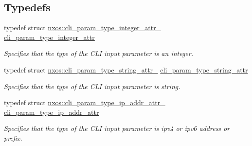 \subsection*{Typedefs}
\begin{DoxyCompactItemize}
\item 
typedef struct \mbox{\hyperlink{structnxos_1_1cli__param__type__integer__attr__}{nxos\+::cli\+\_\+param\+\_\+type\+\_\+integer\+\_\+attr\+\_\+}} \mbox{\hyperlink{namespacenxos_af2f51c364841ed08c6f9a2c913ceea94}{cli\+\_\+param\+\_\+type\+\_\+integer\+\_\+attr}}
\begin{DoxyCompactList}\small\item\em Specifies that the type of the C\+LI input parameter is an integer. \end{DoxyCompactList}\item 
typedef struct \mbox{\hyperlink{structnxos_1_1cli__param__type__string__attr__}{nxos\+::cli\+\_\+param\+\_\+type\+\_\+string\+\_\+attr\+\_\+}} \mbox{\hyperlink{namespacenxos_ae9180fe1c485780c950cb67a7091162c}{cli\+\_\+param\+\_\+type\+\_\+string\+\_\+attr}}
\begin{DoxyCompactList}\small\item\em Specifies that the type of the C\+LI input parameter is string. \end{DoxyCompactList}\item 
typedef struct \mbox{\hyperlink{structnxos_1_1cli__param__type__ip__addr__attr__}{nxos\+::cli\+\_\+param\+\_\+type\+\_\+ip\+\_\+addr\+\_\+attr\+\_\+}} \mbox{\hyperlink{namespacenxos_a860b9fd4c45259ff41c89f65ab426017}{cli\+\_\+param\+\_\+type\+\_\+ip\+\_\+addr\+\_\+attr}}
\begin{DoxyCompactList}\small\item\em Specifies that the type of the C\+LI input parameter is ipv4 or ipv6 address or prefix. \end{DoxyCompactList}\end{DoxyCompactItemize}
